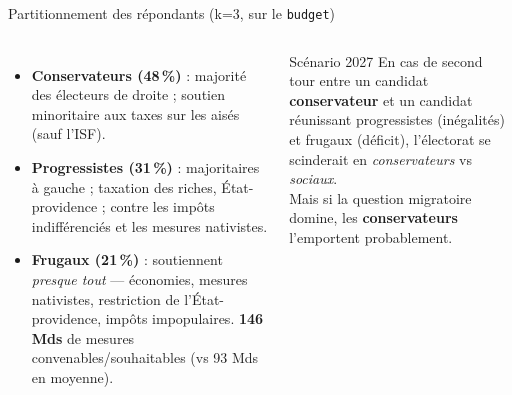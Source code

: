 \documentclass[11pt,aspectratio=169,french]{beamer}
\newcommand{\g}[1]{\textcolor{cleft}{#1}}
\newcommand{\cd}[1]{\textcolor{ccdroit}{#1}}
\newcommand{\fr}[1]{\textcolor{cfrug}{#1}}
\begin{document}
\begin{frame}{Partitionnement des répondants (k=3, sur le \texttt{budget})}
  \begin{columns}[T]
    \begin{itemize}
      \item \textbf{Conservateurs (48\,\%)} : majorité des électeurs de droite ;
            soutien minoritaire aux taxes sur les aisés (sauf l'ISF).
      \item \fr{\textbf{Progressistes (31\,\%)}} : majoritaires à gauche ; taxation des riches,
            État-providence ; contre les impôts indifférenciés et les mesures nativistes.
      \item \fr{\textbf{Frugaux (21\,\%)}} : soutiennent \emph{presque tout} —
            économies, mesures nativistes, restriction de l'État-providence, impôts impopulaires.
            \textbf{146 Mds} de mesures convenables/souhaitables (vs 93 Mds en moyenne).
    \end{itemize}
    \footnotesize
    \begin{block}{Scénario 2027}
      En cas de second tour entre un candidat \textbf{conservateur} et un candidat
      réunissant \fr{progressistes} (inégalités) et \fr{frugaux} (déficit), l'électorat
      se scinderait en \emph{conservateurs} vs \emph{sociaux}.
      \\[2pt]
      Mais si la question migratoire domine, les \textbf{conservateurs} l'emportent probablement.
    \end{block}
  \end{columns}
\end{frame}

\end{document}
